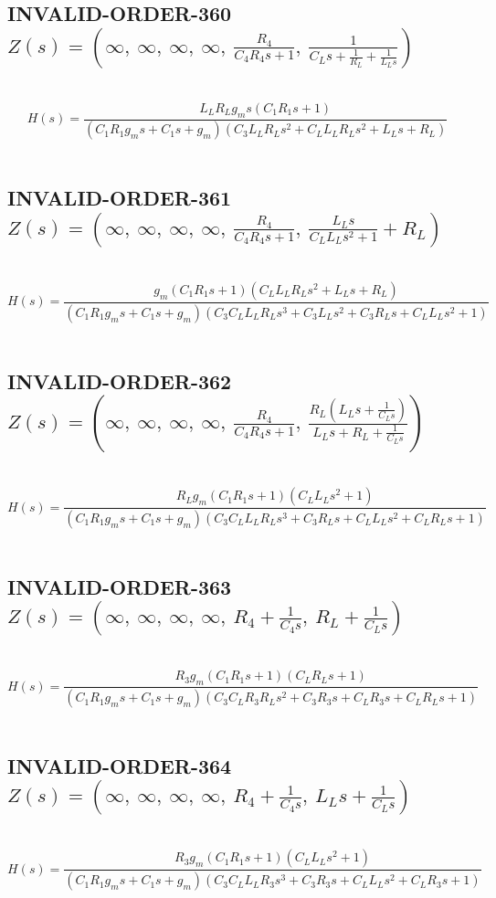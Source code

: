 \documentclass{article}
\begin{document}
\subsection{INVALID-ORDER-360 $Z(s) = \left( \infty, \  \infty, \  \infty, \  \infty, \  \frac{R_{4}}{C_{4} R_{4} s + 1}, \  \frac{1}{C_{L} s + \frac{1}{R_{L}} + \frac{1}{L_{L} s}}\right)$ } \ 
\textbf{\[H(s) = \frac{L_{L} R_{L} g_{m} s \left(C_{1} R_{1} s + 1\right)}{\left(C_{1} R_{1} g_{m} s + C_{1} s + g_{m}\right) \left(C_{3} L_{L} R_{L} s^{2} + C_{L} L_{L} R_{L} s^{2} + L_{L} s + R_{L}\right)}\] } \ 
\subsection{INVALID-ORDER-361 $Z(s) = \left( \infty, \  \infty, \  \infty, \  \infty, \  \frac{R_{4}}{C_{4} R_{4} s + 1}, \  \frac{L_{L} s}{C_{L} L_{L} s^{2} + 1} + R_{L}\right)$ } \ 
\textbf{\[H(s) = \frac{g_{m} \left(C_{1} R_{1} s + 1\right) \left(C_{L} L_{L} R_{L} s^{2} + L_{L} s + R_{L}\right)}{\left(C_{1} R_{1} g_{m} s + C_{1} s + g_{m}\right) \left(C_{3} C_{L} L_{L} R_{L} s^{3} + C_{3} L_{L} s^{2} + C_{3} R_{L} s + C_{L} L_{L} s^{2} + 1\right)}\] } \ 
\subsection{INVALID-ORDER-362 $Z(s) = \left( \infty, \  \infty, \  \infty, \  \infty, \  \frac{R_{4}}{C_{4} R_{4} s + 1}, \  \frac{R_{L} \left(L_{L} s + \frac{1}{C_{L} s}\right)}{L_{L} s + R_{L} + \frac{1}{C_{L} s}}\right)$ } \ 
\textbf{\[H(s) = \frac{R_{L} g_{m} \left(C_{1} R_{1} s + 1\right) \left(C_{L} L_{L} s^{2} + 1\right)}{\left(C_{1} R_{1} g_{m} s + C_{1} s + g_{m}\right) \left(C_{3} C_{L} L_{L} R_{L} s^{3} + C_{3} R_{L} s + C_{L} L_{L} s^{2} + C_{L} R_{L} s + 1\right)}\] } \ 
\subsection{INVALID-ORDER-363 $Z(s) = \left( \infty, \  \infty, \  \infty, \  \infty, \  R_{4} + \frac{1}{C_{4} s}, \  R_{L} + \frac{1}{C_{L} s}\right)$ } \ 
\textbf{\[H(s) = \frac{R_{3} g_{m} \left(C_{1} R_{1} s + 1\right) \left(C_{L} R_{L} s + 1\right)}{\left(C_{1} R_{1} g_{m} s + C_{1} s + g_{m}\right) \left(C_{3} C_{L} R_{3} R_{L} s^{2} + C_{3} R_{3} s + C_{L} R_{3} s + C_{L} R_{L} s + 1\right)}\] } \ 
\subsection{INVALID-ORDER-364 $Z(s) = \left( \infty, \  \infty, \  \infty, \  \infty, \  R_{4} + \frac{1}{C_{4} s}, \  L_{L} s + \frac{1}{C_{L} s}\right)$ } \ 
\textbf{\[H(s) = \frac{R_{3} g_{m} \left(C_{1} R_{1} s + 1\right) \left(C_{L} L_{L} s^{2} + 1\right)}{\left(C_{1} R_{1} g_{m} s + C_{1} s + g_{m}\right) \left(C_{3} C_{L} L_{L} R_{3} s^{3} + C_{3} R_{3} s + C_{L} L_{L} s^{2} + C_{L} R_{3} s + 1\right)}\] } \ 
\end{document}
